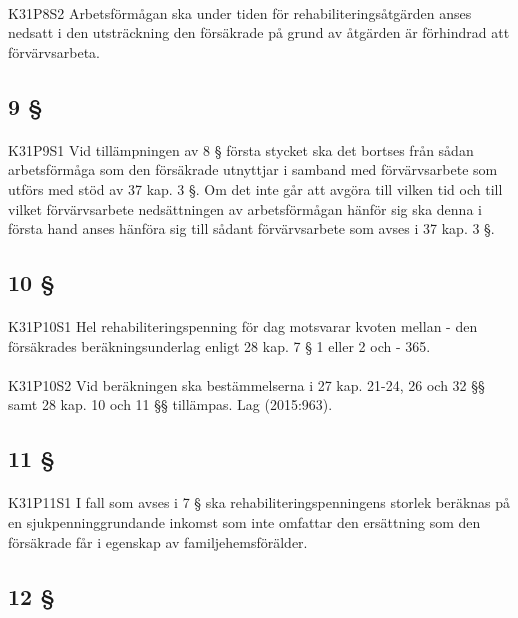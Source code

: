\documentclass[a4paper,notitlepage,openany,10pt]{book}
\begin{document}
\paragraph*{}
{\tiny K31P8S2}
Arbetsförmågan ska under tiden för rehabiliteringsåtgärden anses nedsatt i den utsträckning den försäkrade på grund av åtgärden är förhindrad att förvärvsarbeta.
\subsection*{9 §}
\paragraph*{}
{\tiny K31P9S1}
Vid tillämpningen av 8 § första stycket ska det bortses från sådan arbetsförmåga som den försäkrade utnyttjar i samband med förvärvsarbete som utförs med stöd av 37 kap. 3 §. Om det inte går att avgöra till vilken tid och till vilket förvärvsarbete nedsättningen av arbetsförmågan hänför sig ska denna i första hand anses hänföra sig till sådant förvärvsarbete som avses i 37 kap. 3 §.
\subsection*{10 §}
\paragraph*{}
{\tiny K31P10S1}
Hel rehabiliteringspenning för dag motsvarar kvoten mellan
\newline - den försäkrades beräkningsunderlag enligt 28 kap. 7 § 1 eller 2 och
\newline - 365.
\paragraph*{}
{\tiny K31P10S2}
Vid beräkningen ska bestämmelserna i 27 kap. 21-24, 26 och 32 §§ samt 28 kap. 10 och 11 §§ tillämpas.
Lag (2015:963).
\subsection*{11 §}
\paragraph*{}
{\tiny K31P11S1}
I fall som avses i 7 § ska rehabiliteringspenningens storlek beräknas på en sjukpenninggrundande inkomst som inte omfattar den ersättning som den försäkrade får i egenskap av familjehemsförälder.
\subsection*{12 §}
\end{document}
